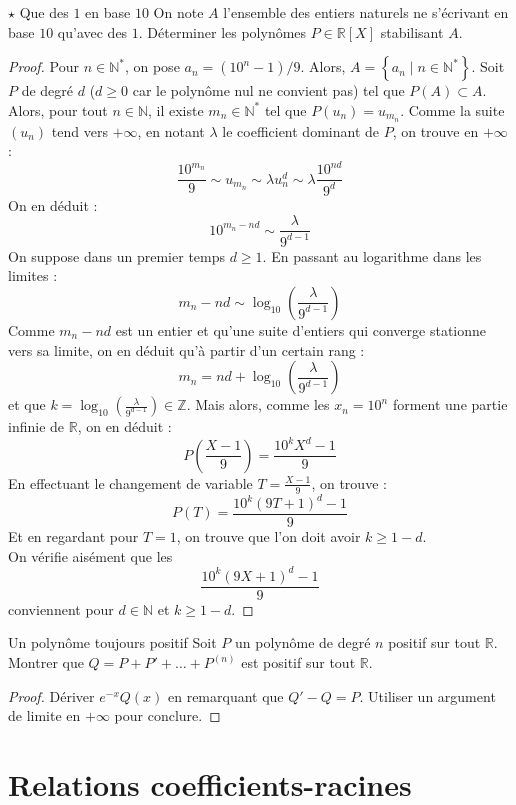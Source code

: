 \documentclass[french,a4paper]{article}
\newcommand{\N}{\mathbb{N}}
\newcommand{\Z}{\mathbb{Z}}
\newcommand{\R}{\mathbb{R}}
\newcommand{\st}{^*}
\theoremstyle{plain}
\theoremstyle{definition}
\theoremstyle{remark}
\begin{document}
\begin{ex}{$\star$ Que des $1$ en base $10$}
	On note $A$ l'ensemble des entiers naturels ne s'écrivant en base $10$ qu'avec des $1$. Déterminer les polynômes $P\in\R[X]$ stabilisant $A$.
\end{ex}
\begin{proof}
	Pour $n\in\N\st$, on pose $a_n=(10^n-1)/9$. Alors, $A=\left\{a_n\mid n\in\N\st\right\}$. Soit $P$ de degré $d$ ($d\geqslant 0$ car le polynôme nul ne convient pas) tel que $P(A)\subset A$. Alors, pour tout $n\in\N$, il existe $m_{n}\in\N\st$ tel que $P(u_n)=u_{m_n}$. Comme la suite $(u_n)$ tend vers $+\infty$, en notant $\lambda$ le coefficient dominant de $P$, on trouve en $+\infty$ : $$\frac{10^{m_n}}{9}\sim u_{m_n}\sim \lambda u_n^d\sim\lambda\frac{10^{nd}}{9^d}$$ On en déduit : $$10^{m_n-nd}\sim\frac{\lambda}{9^{d-1}}$$ On suppose dans un premier temps $d\geqslant 1$. En passant au logarithme dans les limites :  $$m_n-nd\sim\log_{10}\left(\frac{\lambda}{9^{d-1}}\right)$$ Comme $m_n-nd$ est un entier et qu'une suite d'entiers qui converge stationne vers sa limite, on en déduit qu'à partir d'un certain rang : $$m_n=nd+\log_{10}\left(\frac{\lambda}{9^{d-1}}\right)$$ et que $k=\displaystyle\log_{10}\left(\frac{\lambda}{9^{d-1}}\right)\in\Z$.
	Mais alors, comme les $x_n=10^n$ forment une partie infinie de $\R$, on en déduit : $$P\left(\frac{X-1}{9}\right)=\frac{10^kX^d-1}{9}$$ En effectuant le changement de variable $T=\displaystyle\frac{X-1}{9}$, on trouve : $$P(T)=\frac{10^k(9T+1)^d-1}{9}$$ Et en regardant pour $T=1$, on trouve que l'on doit avoir $k\geqslant 1-d$. \\ On vérifie aisément que les $$\frac{10^k(9X+1)^d-1}{9}$$ conviennent pour $d\in\N$ et $k\geqslant 1-d$.
\end{proof}

\begin{ex}[Morlot]{Un polynôme toujours positif}
	Soit $P$ un polynôme de degré $n$ positif sur tout $\R$. Montrer que $Q=P+P'+\ldots+P^{(n)}$ est positif sur tout $\R$. 
\end{ex}
\begin{proof}
	Dériver $e^{-x}Q(x)$ en remarquant que $Q'-Q=P$. Utiliser un argument de limite en $+\infty$ pour conclure.
\end{proof}

\section{Relations coefficients-racines}
\end{document}
